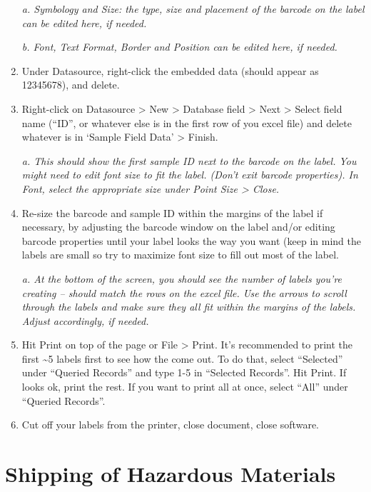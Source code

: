 \documentclass[
  letterpaper,
  DIV=11,
  numbers=noendperiod]{scrreprt}
\begin{document}
\begin{enumerate}
  \emph{a. Symbology and Size: the type, size and placement of the
  barcode on the label can be edited here, if needed.}

  \emph{b. Font, Text Format, Border and Position can be edited here, if
  needed.}
\item
  Under Datasource, right-click the embedded data (should appear as
  12345678), and delete.
\item
  Right-click on Datasource \textgreater{} New \textgreater{} Database
  field \textgreater{} Next \textgreater{} Select field name (``ID'', or
  whatever else is in the first row of you excel file) and delete
  whatever is in `Sample Field Data' \textgreater{} Finish.

  \emph{a. This should show the first sample ID next to the barcode on
  the label. You might need to edit font size to fit the label. (Don't
  exit barcode properties). In Font, select the appropriate size under
  Point Size \textgreater{} Close.}
\item
  Re-size the barcode and sample ID within the margins of the label if
  necessary, by adjusting the barcode window on the label and/or editing
  barcode properties until your label looks the way you want (keep in
  mind the labels are small so try to maximize font size to fill out
  most of the label.

  \emph{a. At the bottom of the screen, you should see the number of
  labels you're creating -- should match the rows on the excel file. Use
  the arrows to scroll through the labels and make sure they all fit
  within the margins of the labels. Adjust accordingly, if needed.}
\item
  Hit Print on top of the page or File \textgreater{} Print. It's
  recommended to print the first \textasciitilde5 labels first to see
  how the come out. To do that, select ``Selected'' under ``Queried
  Records'' and type 1-5 in ``Selected Records''. Hit Print. If looks
  ok, print the rest. If you want to print all at once, select ``All''
  under ``Queried Records''.
\item
  Cut off your labels from the printer, close document, close software.
\end{enumerate}

\hypertarget{shipping-of-hazardous-materials}{%
\chapter{Shipping of Hazardous
Materials}\label{shipping-of-hazardous-materials}}
\end{document}
